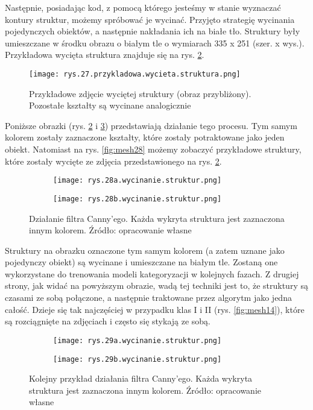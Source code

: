 Następnie, posiadając kod, z pomocą którego jesteśmy w stanie wyznaczać kontury struktur, możemy spróbować je wycinać. Przyjęto strategię wycinania pojedynczych obiektów, a następnie nakładania ich na białe tło. Struktury były umieszczane w środku obrazu o białym tle o wymiarach 335 x 251 (szer. x wys.). Przykładowa wycięta struktura znajduje się na rys. \ref{fig:mesh26}.
\begin{figure}[h]
    \centering
    \texttt{[image: rys.27.przykladowa.wycieta.struktura.png]}
    \caption{Przykładowe zdjęcie wyciętej struktury (obraz przybliżony). Pozostałe kształty są wycinane analogicznie}
    \label{fig:mesh26}
\end{figure}
Poniższe obrazki (rys. \ref{fig:mesh26} i \ref{fig:mesh27}) przedstawiają działanie tego procesu. Tym samym kolorem zostały zaznaczone kształty, które zostały potraktowane jako jeden obiekt. Natomiast na rys. \ref{fig:mesh28} możemy zobaczyć przykładowe struktury, które zostały wycięte ze zdjęcia przedstawionego na rys. \ref{fig:mesh26}. 
\begin{figure}[h]
	\centering
	\begin{subfigure}{0.29\textwidth}
	    \centering
	    \texttt{[image: rys.28a.wycinanie.struktur.png]}
	\end{subfigure}
	\begin{subfigure}{0.29\textwidth}
	    \centering
	    \texttt{[image: rys.28b.wycinanie.struktur.png]}
	\end{subfigure}
	\caption{\label{fig:mesh26}Działanie filtra Canny'ego. Każda wykryta struktura jest zaznaczona innym kolorem. Źródło: opracowanie własne}
\end{figure}
Struktury na obrazku oznaczone tym samym kolorem (a zatem uznane jako pojedynczy obiekt) są wycinane i umieszczane na białym tle. Zostaną one wykorzystane do trenowania modeli kategoryzacji w kolejnych fazach. Z drugiej strony, jak widać na powyższym obrazie, wadą tej techniki jest to, że struktury są czasami ze sobą połączone, a następnie traktowane przez algorytm jako jedna całość. Dzieje się tak najczęściej w przypadku klas I i II (rys. \ref{fig:mesh14}), które są rozciągnięte na zdjęciach i często się stykają ze sobą. 
\begin{figure}[h]
	\centering
	\begin{subfigure}{0.29\textwidth}
	    \centering
	    \texttt{[image: rys.29a.wycinanie.struktur.png]}
	\end{subfigure}
	\begin{subfigure}{0.29\textwidth}
	    \centering
	    \texttt{[image: rys.29b.wycinanie.struktur.png]}
	\end{subfigure}
	\caption{\label{fig:mesh27}Kolejny przykład działania filtra Canny'ego. Każda wykryta struktura jest zaznaczona innym kolorem. Źródło: opracowanie własne}
\end{figure}
